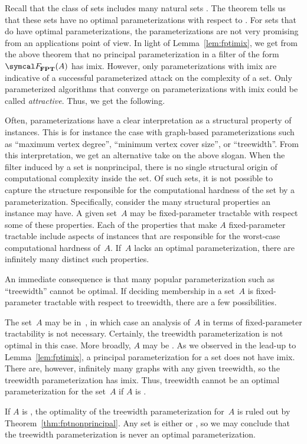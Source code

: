 Recall that the class of  sets includes many natural sets \parencite{orponen1986optimal}.
The theorem tells us that these sets have no optimal parameterizations with respect to .
For sets that do have optimal parameterizations, the parameterizations are not very promising from an applications point of view.
In light of Lemma~\ref{lem:fptimix}, we get from the above theorem that no principal parameterization in a filter of the form $\calF_\cl{FPT}(A)$ has imix.
However, only parameterizations with imix are indicative of a successful parameterized attack on the complexity of a set.
Only parameterized algorithms that converge on parameterizations with imix could be called \emph{attractive}.
Thus, we get the following.
%

Often, parameterizations have a clear interpretation as a structural property of instances.
This is for instance the case with graph-based parameterizations such as \enquote{maximum vertex degree}, \enquote{minimum vertex cover size}, or \enquote{treewidth}.
From this interpretation, we get an alternative take on the above slogan.
When the filter induced by a set is nonprincipal, there is no single structural origin of computational complexity inside the set.
Of such sets, it is not possible to capture the structure responsible for the computational hardness of the set by a parameterization.
Specifically, consider the many structural properties an instance may have.
A given set~$A$ may be fixed-parameter tractable with respect some of these properties.
Each of the properties that make $A$ fixed-parameter tractable include aspects of instances that are responsible for the worst-case computational hardness of~$A$.
If~$A$ lacks an optimal parameterization, there are infinitely many distinct such properties.
\begin{example}
  An immediate consequence is that many popular parameterization such as \enquote{treewidth} cannot be optimal.
  If deciding membership in a set~$A$ is fixed-parameter tractable with respect to treewidth, there are a few possibilities.

  The set~$A$ may be in~, in which case an analysis of~$A$ in terms of fixed-parameter tractability is not necessary.
  Certainly, the treewidth parameterization is not optimal in this case.
  More broadly, $A$ may be .
  As we observed in the lead-up to Lemma~\ref{lem:fptimix}, a principal parameterization for a  set does not have imix.
  There are, however, infinitely many graphs with any given treewidth, so the treewidth parameterization has imix.
  Thus, treewidth cannot be an optimal parameterization for the set~$A$ if $A$ is .

  If $A$ is , the optimality of the treewidth parameterization for~$A$ is ruled out by Theorem~\ref{thm:fptnonprincipal}.
  Any set is either  or , so we may conclude that the treewidth parameterization is never an optimal parameterization.
\end{example}

